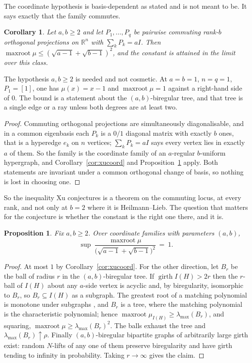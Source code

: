 \documentclass[11pt]{article}
\newtheorem{corollary}[theorem]{Corollary}
\newtheorem{proposition}[theorem]{Proposition}
\theoremstyle{remark}
\begin{document}
The coordinate hypothesis is basis-dependent as stated and is not meant to be. It says exactly
that the family commutes.

\begin{corollary}\label{cor:commuting}
Let $a,b\ge2$ and let $P_1,\dots,P_q$ be pairwise commuting rank-$b$ orthogonal projections on
$\mathbb R^n$ with $\sum_kP_k=aI$. Then $\operatorname{maxroot}\mu\le(\sqrt{a-1}+\sqrt{b-1})^2$, and
the constant is attained in the limit over this class.
\end{corollary}

The hypothesis $a,b\ge2$ is needed and not cosmetic. At $a=b=1$, $n=q=1$, $P_1=[1]$, one has
$\mu(x)=x-1$ and $\operatorname{maxroot}\mu=1$ against a right-hand side of $0$. The bound is a
statement about the $(a,b)$-biregular tree, and that tree is a single edge or a ray unless both
degrees are at least two.

\begin{proof}
Commuting orthogonal projections are simultaneously diagonalisable, and in a common eigenbasis
each $P_k$ is a $0/1$ diagonal matrix with exactly $b$ ones, that is a hyperedge $e_k$ on $n$
vertices; $\sum_kP_k=aI$ says every vertex lies in exactly $a$ of them. So the family is the
coordinate family of an $a$-regular $b$-uniform hypergraph, and Corollary~\ref{cor:xucoord} and
Proposition~\ref{prop:xusharp} apply. Both statements are invariant under a common orthogonal
change of basis, so nothing is lost in choosing one.
\end{proof}

So the inequality Xu conjectures is a theorem on the commuting locus, at every rank, and not only
at $b=2$ where it is Heilmann--Lieb. The question that matters for the conjecture is whether the
constant is the right one there, and it is.

\begin{proposition}\label{prop:xusharp}
Fix $a,b\ge2$. Over coordinate families with parameters $(a,b)$,
\[
\sup\ \frac{\operatorname{maxroot}\mu}{\bigl(\sqrt{a-1}+\sqrt{b-1}\bigr)^2}\ =\ 1 .
\]
\end{proposition}

\begin{proof}
At most $1$ by Corollary~\ref{cor:xucoord}. For the other direction, let $B_r$ be the ball of
radius $r$ in the $(a,b)$-biregular tree. If $\operatorname{girth}I(H)>2r$ then the $r$-ball of
$I(H)$ about any $a$-side vertex is acyclic and, by biregularity, isomorphic to $B_r$, so
$B_r\subseteq I(H)$ as a subgraph. The greatest root of a matching polynomial is monotone under
subgraphs \cite{HL,Go}, and $B_r$ is a tree, where the matching polynomial is the characteristic
polynomial; hence
$\operatorname{maxroot}\mu_{I(H)}\ge\lambda_{\max}(B_r)$, and squaring,
$\operatorname{maxroot}\mu\ge\lambda_{\max}(B_r)^2$. The balls exhaust the tree and
$\lambda_{\max}(B_r)\uparrow\rho$. Finally $(a,b)$-biregular bipartite graphs of arbitrarily large
girth exist: random $N$-lifts of any one of them preserve biregularity and have girth tending to
infinity in probability. Taking $r\to\infty$ gives the claim.
\end{proof}
\end{document}

